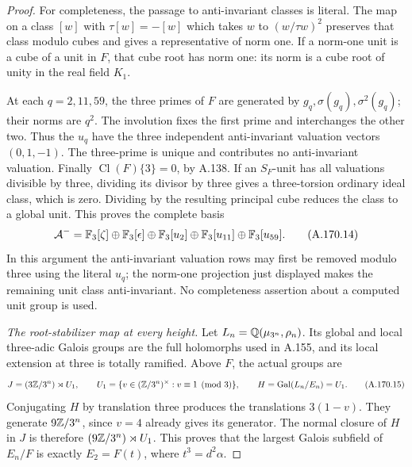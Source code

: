 \begin{proof}
For completeness, the passage to anti-invariant classes is literal.
The map on a class \([w]\) with
\(\tau[w]=-[w]\) which takes \(w\) to \((w/\tau w)^2\)
preserves that class modulo cubes and gives a representative of
norm one.  If a norm-one unit is a cube of a unit in \(F\), that
cube root has norm one: its norm is a cube root of unity in the
real field \(K_1\).

At each \(q=2,11,59\), the three primes of \(F\) are generated
by \(g_q,\sigma(g_q),\sigma^2(g_q)\); their norms are \(q^2\).
The involution fixes the first prime and interchanges the other
two.  Thus the \(u_q\) have the three independent anti-invariant
valuation vectors \((0,1,-1)\).  The three-prime is unique and
contributes no anti-invariant valuation.
Finally \(\operatorname{Cl}(F)\{3\}=0\), by A.138.
If an \(S_F\)-unit has all valuations divisible by three, dividing
its divisor by three gives a three-torsion ordinary ideal class,
which is zero.  Dividing by the resulting principal cube reduces
the class to a global unit.  This proves the complete basis
\[
          \mathcal A^-=
              \mathbb F_3[\zeta]\oplus\mathbb F_3[\epsilon]\oplus
              \mathbb F_3[u_2]\oplus\mathbb F_3[u_{11}]\oplus\mathbb F_3[u_{59}].
\tag{A.170.14}
\]
In this argument the anti-invariant valuation rows may first be
removed modulo three using the literal \(u_q\); the norm-one
projection just displayed makes the remaining unit class
anti-invariant.  No completeness assertion about a computed
unit group is used.

\emph{The root-stabilizer map at every height.}
Let \(L_n=\mathbb Q(\mu_{3^n},\rho_n)\).
Its global and local three-adic Galois groups are the full
holomorphs used in A.155, and its local extension at three is
totally ramified.  Above \(F\), the actual groups are
\[
 J=(3\mathbb Z/3^n)\rtimes U_1,\qquad
 U_1=\{v\in(\mathbb Z/3^n)^\times:v\equiv1\pmod3\},
 \qquad H=\operatorname{Gal}(L_n/E_n)=U_1.
\tag{A.170.15}
\]
Conjugating \(H\) by translation three produces the translations
\(3(1-v)\).  They generate \(9\mathbb Z/3^n\), since \(v=4\)
already gives its generator.  The normal closure of \(H\) in
\(J\) is therefore \((9\mathbb Z/3^n)\rtimes U_1\).
This proves that the largest Galois subfield of \(E_n/F\) is
exactly \(E_2=F(t)\), where \(t^3=d^2\alpha\).


\end{proof}
